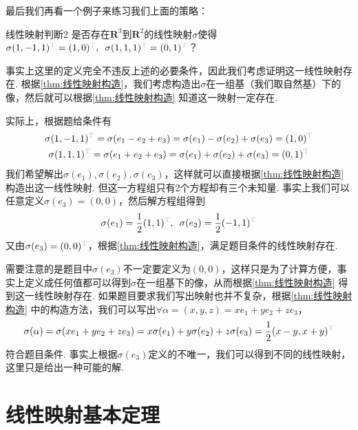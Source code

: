 最后我们再看一个例子来练习我们上面的策略：
\begin{example}{}{线性映射判断2}
    是否存在$\mathbf{R}^3$到$\mathbf{R}^2$的线性映射$\sigma$使得$\sigma(1,-1,1)^{\color{lightgray}\mathrm{T}}=(1,0)^{\color{lightgray}\mathrm{T}},\enspace\sigma(1,1,1)^{\color{lightgray}\mathrm{T}}=(0,1)^{\color{lightgray}\mathrm{T}}$？
\end{example}

\begin{solution}
    事实上这里的定义完全不违反上述的必要条件，因此我们考虑证明这一线性映射存在. 根据\autoref{thm:线性映射构造}，我们考虑构造出$\sigma$在一组基（我们取自然基）下的像，然后就可以根据\autoref*{thm:线性映射构造} 知道这一映射一定存在.

    实际上，根据题给条件有
    \begin{gather*}
        \sigma(1,-1,1)^{\color{lightgray}\mathrm{T}}
        =\sigma(e_1-e_2+e_3)
        =\sigma(e_1)-\sigma(e_2)+\sigma(e_3)
        =(1,0)^{\color{lightgray}\mathrm{T}} \\
        \sigma(1,1,1)^{\color{lightgray}\mathrm{T}}
        =\sigma(e_1+e_2+e_3)
        =\sigma(e_1)+\sigma(e_2)+\sigma(e_3)
        =(0,1)^{\color{lightgray}\mathrm{T}}
    \end{gather*}
    我们希望解出$\sigma(e_1),\sigma(e_2),\sigma(e_3)$，这样就可以直接根据\autoref*{thm:线性映射构造} 构造出这一线性映射. 但这一方程组只有2个方程却有三个未知量. 事实上我们可以任意定义$\sigma(e_3)=(0,0)$，然后解方程组得到
    \[\sigma(e_1)=\dfrac{1}{2} (1,1)^{\color{lightgray}\mathrm{T}},\enspace \sigma(e_2)=\dfrac{1}{2} (-1,1)^{\color{lightgray}\mathrm{T}}\]
    又由$\sigma(e_3)=(0,0)^{\color{lightgray}\mathrm{T}}$，根据\autoref*{thm:线性映射构造}，满足题目条件的线性映射存在.
\end{solution}
需要注意的是题目中$\sigma(e_3)$不一定要定义为$(0,0)$，这样只是为了计算方便，事实上定义成任何值都可以得到$\sigma$在一组基下的像，从而根据\autoref*{thm:线性映射构造} 得到这一线性映射存在. 如果题目要求我们写出映射也并不复杂，根据\autoref*{thm:线性映射构造} 中的构造方法，我们可以写出$\forall\alpha=(x,y,z)=xe_1+ye_2+ze_3$，
\[
    \sigma(\alpha)
    =\sigma(xe_1+ye_2+ze_3)
    =x\sigma(e_1)+y\sigma(e_2)+z\sigma(e_3)
    =\dfrac{1}{2} (x-y,x+y)^{\color{lightgray}\mathrm{T}}
\]
符合题目条件. 事实上根据$\sigma(e_3)$定义的不唯一，我们可以得到不同的线性映射，这里只是给出一种可能的解.

\section{线性映射基本定理}

